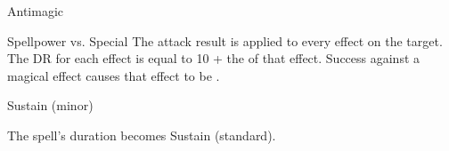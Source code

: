 \begin{spellsection}{Antimagic}
\begin{spellcontent}
\begin{spelltargetinginfo}
\end{spelltargetinginfo}
\begin{spelleffects}
\begin{spellattack}{Spellpower vs. Special}
\spellspecial
The attack result is applied to every  effect on the target.
The DR for each effect is equal to 10 + the  of that effect.
\spellsuccess
Success against a magical effect causes that effect to be .
\end{spellattack}
\spelldur Sustain (minor)
\end{spelleffects}
\end{spellcontent}
\begin{spellfooter}
\end{spellfooter}
\begin{spellsubcontent}
\begin{spellcantrip}
The spell's duration becomes Sustain (standard).
\end{spellcantrip}
\end{spellsubcontent}
\end{spellsection}
